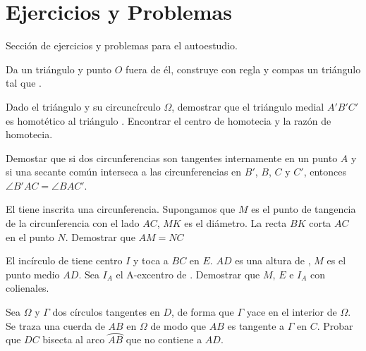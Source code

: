 \section{Ejercicios y Problemas}

Sección de ejercicios y problemas para el autoestudio.

\begin{section-exercise}
    Da un triángulo  y punto $O$ fuera de él, construye con regla y compas un triángulo  tal que .
\end{section-exercise}


\begin{section-problem}
    Dado el triángulo  y su circuncírculo $\Omega$, demostrar que el triángulo medial $A' B' C'$ es homotético al triángulo .
    Encontrar el centro de homotecia y la razón de homotecia.
\end{section-problem}

\begin{section-problem}
    Demostar que si dos circunferencias son tangentes internamente en un punto $A$ y si una secante común interseca a las circunferencias en $B'$, $B$, $C$ y $C'$, entonces $\angle B' AC = \angle BAC'$.
\end{section-problem}

\begin{section-problem}
    El  tiene inscrita una circunferencia.
    Supongamos que $M$ es el punto de tangencia de la circunferencia con el lado $AC$, $MK$ es el diámetro.
    La recta $BK$ corta $AC$ en el punto $N$.
    Demostrar que $AM = NC$
\end{section-problem}

\begin{section-problem}
    El incírculo de  tiene centro $I$ y toca a $BC$ en $E$.
    $AD$ es una altura de , $M$ es el punto medio $AD$.
    Sea $I_A$ el A-excentro de .
    Demostrar que $M$, $E$ e $I_A$ con colienales.
\end{section-problem}

\begin{section-problem}
    Sea $\Omega$ y $\Gamma$ dos círculos tangentes en $D$, de forma que $\Gamma$ yace en el interior de $\Omega$.
    Se traza una cuerda de $AB$ en $\Omega$ de modo que $AB$ es tangente a $\Gamma$ en $C$.
    Probar que $DC$ bisecta al arco $\wideparen{AB}$ que no contiene a $AD$.
\end{section-problem}